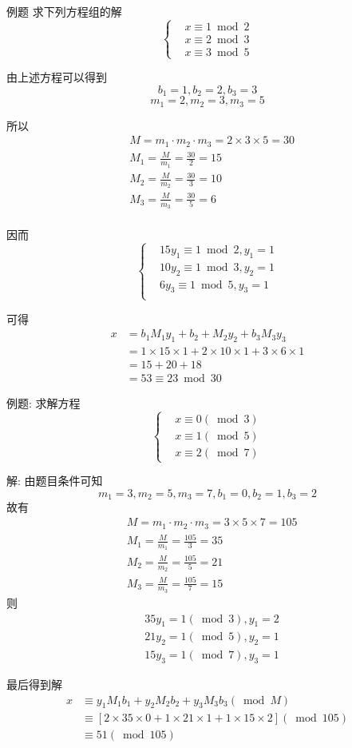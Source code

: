 \documentclass[UTF8]{ctexart}
\begin{document}
    例题 求下列方程组的解
    $$
    \left\{ \begin{aligned}
        &x\equiv 1\bmod 2\\
        &x\equiv 2\bmod 3\\
        &x\equiv 3\bmod 5
    \end{aligned}\right.
    $$

    由上述方程可以得到
    $$b_1=1, b_2=2, b_3=3$$
    $$m_1=2, m_2=3, m_3=5$$

    所以
    $$
    \begin{aligned}
        &M=m_1\cdot m_2\cdot m_3=2\times 3\times 5=30\\
        &M_1=\frac{M}{m_1}=\frac{30}{2}=15\\
        &M_2=\frac{M}{m_2}=\frac{30}{3}=10\\
        &M_3=\frac{M}{m_3}=\frac{30}{5}=6\\
    \end{aligned}
    $$

    因而
    $$
    \left\{ \begin{aligned}
        &15y_1\equiv 1\bmod 2, y_1=1\\
        &10y_2\equiv 1\bmod 3, y_2=1\\
        &6y_3\equiv 1\bmod 5, y_3=1\\
    \end{aligned}\right.
    $$

    可得
    $$
    \begin{aligned}
        x&=b_1M_1y_1+b_2+M_2y_2+b_3M_3y_3\\
         &=1\times 15\times 1+2\times 10\times  1+3\times 6\times 1\\
         &=15+20+18\\
         &=53\equiv 23\bmod 30
    \end{aligned}
    $$

    例题: 求解方程
    $$
    \left\{ \begin{aligned}
        &x\equiv 0(\bmod 3)\\
        &x\equiv 1(\bmod 5)\\
        &x\equiv 2(\bmod 7)
    \end{aligned}\right.
    $$

    解: 由题目条件可知
    $$m_1=3, m_2=5, m_3=7, b_1=0, b_2=1, b_3=2$$
    故有
    $$
    \begin{aligned}
        &M=m_1\cdot m_2\cdot m_3=3\times 5\times 7=105\\
        &M_1=\frac{M}{m_1}=\frac{105}{3}=35\\
        &M_2=\frac{M}{m_2}=\frac{105}{5}=21\\
        &M_3=\frac{M}{m_3}=\frac{105}{7}=15
    \end{aligned}
    $$
    则
    $$
    \begin{aligned}
        &35y_1=1(\bmod 3), y_1=2\\
        &21y_2=1(\bmod 5), y_2=1\\
        &15y_3=1(\bmod 7), y_3=1
    \end{aligned}
    $$

    最后得到解
    $$
    \begin{aligned}
        x&\equiv y_1M_1b_1+y_2M_2b_2+y_3M_3b_3(\bmod M)\\
         &\equiv [2\times 35\times 0+1\times 21\times 1+1\times 15\times 2](\bmod 105)\\
         &\equiv 51(\bmod 105)\\
    \end{aligned}
    $$
\end{document}

